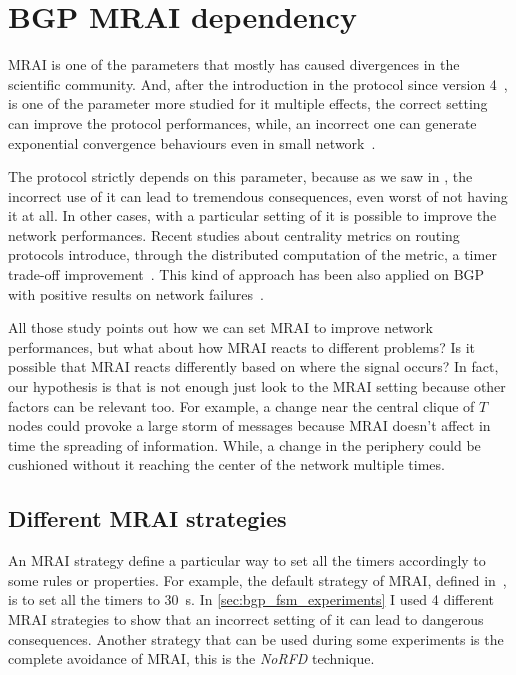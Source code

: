 \chapter{BGP MRAI dependency}
\label{cha:bgp_mrai_experiments}

\ac{MRAI} is one of the parameters that mostly has caused divergences in the
scientific community.
And, after the introduction in the protocol since version 4~\cite{rfc4271},
is one of the parameter more studied for it multiple effects, the correct setting
can improve the protocol performances, while, an incorrect one can generate
exponential convergence behaviours even in small network~\cite{fabrikant2011there,griffin2001experimental}.

The protocol strictly depends on this parameter, because as we saw in ,
the incorrect use of it can lead to tremendous consequences, even worst of not
having it at all.
In other cases, with a particular setting of it is possible to improve the network
performances.
Recent studies about centrality metrics on routing protocols introduce, through
the distributed computation of the metric, a
timer trade-off improvement~\cite{MaLo18_ToN,GhiMa18_infocom}.
This kind of approach has been also applied on \ac{BGP} with positive results on
network failures~\cite{milani2019BGP,milani2020improving}.

All those study points out how we can set \ac{MRAI} to improve network
performances, but what about how \ac{MRAI} reacts to different problems?
Is it possible that \ac{MRAI} reacts differently based on where the signal
occurs?
In fact, our hypothesis is that is not enough just look to the \ac{MRAI} setting
because other factors can be relevant too.
For example, a change near the central clique of $T$ nodes could provoke a large
storm of messages because \ac{MRAI} doesn't affect in time the spreading of information.
While, a change in the periphery could be cushioned without it reaching the center
of the network multiple times.

\section{Different MRAI strategies}
\label{sec:bgp_mrai_strategies}

An \ac{MRAI} strategy define a particular way to set all the timers accordingly
to some rules or properties.
For example, the default strategy of \ac{MRAI}, defined in~\cite{rfc4271}, is
to set all the timers to \SI{30}{\second}.
In \cref{sec:bgp_fsm_experiments} I used \num{4} different \ac{MRAI} strategies
to show that an incorrect setting of it can lead to dangerous consequences.
Another strategy that can be used during some experiments is the complete avoidance
of \ac{MRAI}, this is the \emph{NoRFD} technique.

